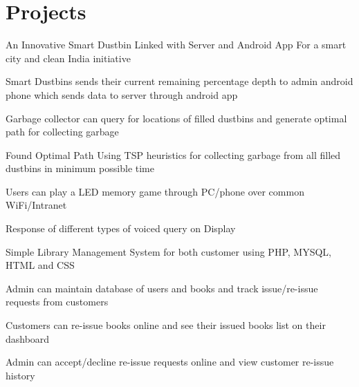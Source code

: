 \documentclass[]{single-page-resume}
\begin{document}
\hfill
\begin{minipage}[t]{0.62\textwidth} 


\section{Projects}

\vspace{\topsep} %
\begin{tightemize}
    \item An Innovative Smart Dustbin Linked with Server and Android App For a smart city and clean India initiative
    \item Smart Dustbins sends their current remaining  percentage depth to admin android phone which sends data to server through 		android app
    \item Garbage collector can query for locations of filled dustbins and generate optimal path for collecting garbage 
    \item Found Optimal Path Using TSP heuristics for collecting garbage from all filled dustbins in minimum possible time
\end{tightemize}
\sectionsep

\begin{tightemize}
    \item Users can play a LED memory game through PC/phone over common WiFi/Intranet 
    \item Response of different types of voiced query on Display 
    \end{tightemize}
\sectionsep

\begin{tightemize}
    \item Simple  Library Management System for both customer using PHP,  MYSQL,  HTML and  CSS
    \item Admin can maintain database of users and books and track issue/re-issue requests from customers
    \item Customers can re-issue books online and see their issued books list on their dashboard
    \item Admin can accept/decline re-issue requests online and view customer re-issue history \end{tightemize}
\sectionsep


\end{minipage}
\end{document}
